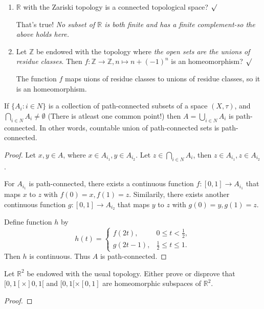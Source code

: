 \documentclass[oneside]{report}
\theoremstyle{mytheoremstyle}
\theoremstyle{mytheoremstyle}
\theoremstyle{myproblemstyle}
\begin{document}
\begin{enumerate}
    That's true! \emph{proof} : 
    \item $\mathbb{R}$ with the Zariski topology is a connected topological space?  $\surd$
    
    That's true! \emph{No subset of $\mathbb{R}$ is both finite and has a finite complement-so the above holds here.}
    \item Let $\mathbb{Z}$ be endowed with the topology where \emph{the open sets are the unions of residue classes}. Then $f\colon \mathbb{Z}\to\mathbb{Z}, n\mapsto n+(-1)^{n}$ is an homeomorphism? $\surd$
    
    The function $f$ maps uions of residue classes to unions of residue classes, so it is an homeomorphism.
\end{enumerate}

\begin{problem}
If $\{A_i : i\in N\}$ is a collection of path-connected subsets of a space $(X,\tau)$, and $\bigcap_{i\in N}A_i\neq \emptyset$ (There is atleast one common point!)
then $A=\bigcup_{i\in N}A_i$ is path-connected. In other words, countable union of path-connected sets is path-connected.
\end{problem}
\begin{proof}
    Let $x,y\in A$, where $x\in A_{i_1}, y\in A_{i_2}$. Let $z\in \bigcap_{i\in N}A_i$, then $z\in A_{i_1}, z\in A_{i_2}$.

    For $A_{i_1}$ is path-connected, there exists a continuous function $f\colon [0,1]\to A_{i_1}$ that maps $x$ to $z$ with $f(0)=x,f(1)=z$. Similarily, 
    there exists another continuous function $g\colon [0,1]\to A_{i_2}$ that maps $y$ to $z$ with $g(0)=y, g(1)=z$.

    Define function $h$ by 
    \[
        h(t)=\begin{cases}
            f(2t), & 0\leqslant t <\frac 12,\\ 
            g(2t-1), & \frac 12 \leqslant t \leqslant 1.
        \end{cases}
    \]
    Then $h$ is continuous. Thus $A$ is path-connected.
\end{proof}
\begin{problem}[$(\star\star\star)$]
     Let $\mathbb{R}^2$ be endowed with the usual topology. Either prove or disprove that $[0,1[\times ]0,1[$ and $[0,1[\times [0,1]$ are homeomorphic subspaces of $\mathbb{R}^2$.
\end{problem}

\begin{proof}

\end{proof}










\end{document}
